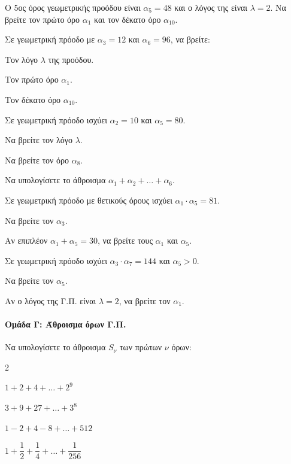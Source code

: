 \documentclass[11pt,a4paper,modern]{FFExercises}
\begin{document}
\askhsh
Ο 5ος όρος γεωμετρικής προόδου είναι $\alpha_5 = 48$ και ο λόγος της είναι $\lambda = 2$. Να βρείτε τον πρώτο όρο $\alpha_1$ και τον δέκατο όρο $\alpha_{10}$.

\askhsh
Σε γεωμετρική πρόοδο με $\alpha_3 = 12$ και $\alpha_6 = 96$, να βρείτε:
\begin{alist}
  \item Τον λόγο $\lambda$ της προόδου.
  \item Τον πρώτο όρο $\alpha_1$.
  \item Τον δέκατο όρο $\alpha_{10}$.
\end{alist}

\askhsh
Σε γεωμετρική πρόοδο ισχύει $\alpha_2 = 10$ και $\alpha_5 = 80$.
\begin{alist}
  \item Να βρείτε τον λόγο $\lambda$.
  \item Να βρείτε τον όρο $\alpha_8$.
  \item Να υπολογίσετε το άθροισμα $\alpha_1 + \alpha_2 + \ldots + \alpha_6$.
\end{alist}

\askhsh
Σε γεωμετρική πρόοδο με θετικούς όρους ισχύει $\alpha_1 \cdot \alpha_5 = 81$.
\begin{alist}
  \item Να βρείτε τον $\alpha_3$.
  \item Αν επιπλέον $\alpha_1 + \alpha_5 = 30$, να βρείτε τους $\alpha_1$ και $\alpha_5$.
\end{alist}

\askhsh
Σε γεωμετρική πρόοδο ισχύει $\alpha_3 \cdot \alpha_7 = 144$ και $\alpha_5 > 0$.
\begin{alist}
  \item Να βρείτε τον $\alpha_5$.
  \item Αν ο λόγος της Γ.Π. είναι $\lambda = 2$, να βρείτε τον $\alpha_1$.
\end{alist}


\paragraph{Ομάδα Γ: Άθροισμα όρων Γ.Π.}

\askhsh
Να υπολογίσετε το άθροισμα $S_\nu$ των πρώτων $\nu$ όρων:
\begin{multicols}{2}
\begin{alist}
  \item $1 + 2 + 4 + \ldots + 2^9$
  \item $3 + 9 + 27 + \ldots + 3^8$
  \item $1 - 2 + 4 - 8 + \ldots + 512$
  \item $1 + \dfrac{1}{2} + \dfrac{1}{4} + \ldots + \dfrac{1}{256}$
\end{alist}
\end{multicols}
\end{document}
